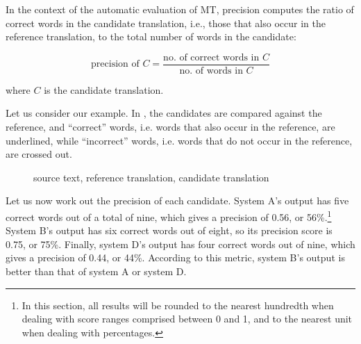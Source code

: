 \documentclass[output=paper]{langscibook}
\begin{document}
In the context of the automatic evaluation of MT, precision computes the ratio of correct words in the candidate translation, i.e., those that also occur in the reference translation, to the total number of words in the candidate:\pagebreak

\begin{equation}
\text{precision of }C=\frac{\text{no. of correct words in } C}{\text{no. of words in } C}
\end{equation}

where $C$ is the candidate translation.

Let us consider our example. In , the candidates are compared against the reference, and “correct” words, i.e. words that also occur in the reference, are underlined, while “incorrect” words, i.e. words that do not occur in the reference, are crossed out.

\begin{figure}
\small
{}
\caption{source text, reference translation, candidate translation}
\label{fig:rossi:6}
\end{figure}

Let us now work out the precision of each candidate. System A’s output has five correct words out of a total of nine, which gives a precision of 0.56, or 56\%.\footnote{In this section, all results will be rounded to the nearest hundredth when dealing with score ranges comprised between 0 and 1, and to the nearest unit when dealing with percentages.} System B’s output has six correct words out of eight, so its precision score is 0.75, or 75\%. Finally, system D’s output has four correct words out of nine, which gives a precision of 0.44, or 44\%. According to this metric, system B’s output is better than that of system A or system D.
\end{document}
